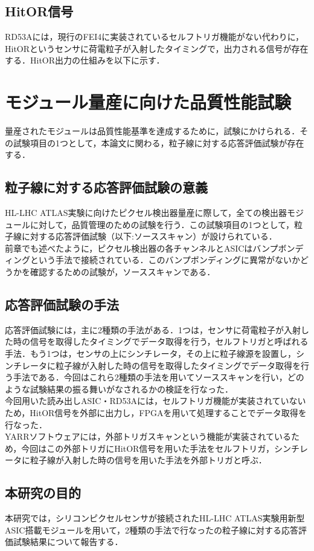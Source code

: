 \subsection{HitOR信号}
RD53Aには，現行のFEI4に実装されているセルフトリガ機能がない代わりに，HitORというセンサに荷電粒子が入射したタイミングで，出力される信号が存在する．HitOR出力の仕組みを以下に示す．


\section{モジュール量産に向けた品質性能試験}
量産されたモジュールは品質性能基準を達成するために，試験にかけられる．その試験項目の1つとして，本論文に関わる，粒子線に対する応答評価試験が存在する．

\subsection{粒子線に対する応答評価試験の意義}
HL-LHC ATLAS実験に向けたピクセル検出器量産に際して，全ての検出器モジュールに対して，品質管理のための試験を行う．この試験項目の1つとして，粒子線に対する応答評価試験（以下:ソーススキャン）が設けられている．\\
前章でも述べたように，ピクセル検出器の各チャンネルとASICはバンプボンディングという手法で接続されている．このバンプボンディングに異常がないかどうかを確認するための試験が，ソーススキャンである．\\

\subsection{応答評価試験の手法}
応答評価試験には，主に2種類の手法がある．1つは，センサに荷電粒子が入射した時の信号を取得したタイミングでデータ取得を行う，セルフトリガと呼ばれる手法．もう1つは，センサの上にシンチレータ，その上に粒子線源を設置し，シンチレータに粒子線が入射した時の信号を取得したタイミングでデータ取得を行う手法である．今回はこれら2種類の手法を用いてソーススキャンを行い，どのような試験結果の振る舞いがなされるかの検証を行なった．\\
今回用いた読み出しASIC・RD53Aには，セルフトリガ機能が実装されていないため，HitOR信号を外部に出力し，FPGAを用いて処理することでデータ取得を行なった．\\
YARRソフトウェアには，外部トリガスキャンという機能が実装されているため，今回はこの外部トリガにHitOR信号を用いた手法をセルフトリガ，シンチレータに粒子線が入射した時の信号を用いた手法を外部トリガと呼ぶ．

\subsection{本研究の目的}
本研究では，シリコンピクセルセンサが接続されたHL-LHC ATLAS実験用新型ASIC搭載モジュールを用いて，2種類の手法で行なったの粒子線に対する応答評価試験結果について報告する．
